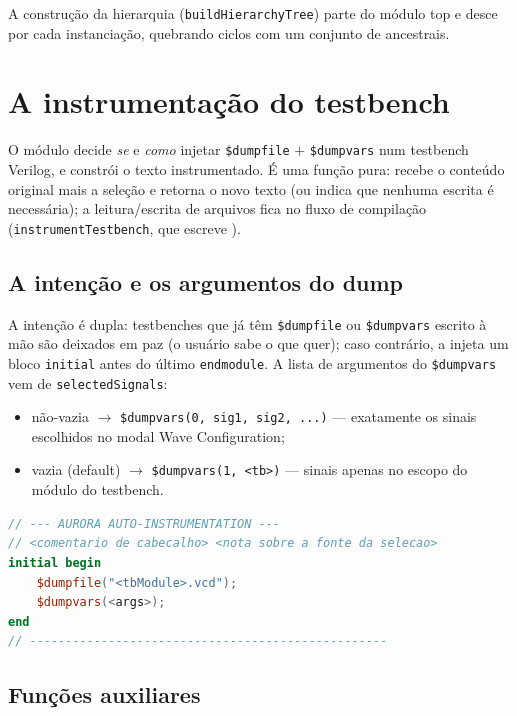 A construção da hierarquia (\lstinline|buildHierarchyTree|) parte do módulo top
e desce por cada instanciação, quebrando ciclos com um conjunto de
ancestrais.

\section{A instrumentação do testbench}

O módulo  decide \emph{se} e
\emph{como} injetar \lstinline|$dumpfile| $+$ \lstinline|$dumpvars| num
testbench Verilog, e constrói o texto instrumentado. É uma função pura: recebe o
conteúdo original mais a seleção e retorna o novo texto (ou indica que nenhuma
escrita é necessária); a leitura/escrita de arquivos fica no fluxo de
compilação (\lstinline|instrumentTestbench|, que escreve
).

\subsection{A intenção e os argumentos do dump}

A intenção é dupla: testbenches que já têm \lstinline|$dumpfile| ou
\lstinline|$dumpvars| escrito à mão são deixados em paz (o usuário sabe o que
quer); caso contrário, a  injeta um bloco \lstinline|initial| antes
do último \lstinline|endmodule|. A lista de argumentos do \lstinline|$dumpvars|
vem de \lstinline|selectedSignals|:

\begin{itemize}[leftmargin=*]
  \item não-vazia $\rightarrow$ \lstinline|$dumpvars(0, sig1, sig2, ...)| ---
    exatamente os sinais escolhidos no modal Wave Configuration;
  \item vazia (default) $\rightarrow$ \lstinline|$dumpvars(1, <tb>)| --- sinais
    apenas no escopo do módulo do testbench.
\end{itemize}

\begin{lstlisting}[language=Verilog,caption={Forma do bloco injetado pela auto-instrumentação.}]
// --- AURORA AUTO-INSTRUMENTATION ---
// <comentario de cabecalho> <nota sobre a fonte da selecao>
initial begin
    $dumpfile("<tbModule>.vcd");
    $dumpvars(<args>);
end
// --------------------------------------------------
\end{lstlisting}

\subsection{Funções auxiliares}

